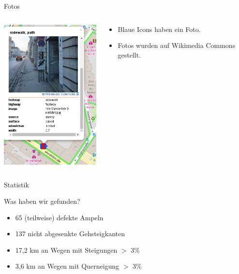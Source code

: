 \documentclass{beamer}
\begin{document}
\begin{frame}{Fotos}

  \begin{columns}[c]
    \begin{column}[T]{.6\textwidth}

      \begin{center}
      \vspace{-1cm}
      \includegraphics[width=5.5cm]{Fotos-screenie.png}
      \end{center}

    \end{column}
    \begin{column}[T]{.4\textwidth}

      \begin{itemize}
        \vspace{1cm}
        \item Blaue Icons haben ein Foto.
        \vspace{1cm}
        \item Fotos wurden auf Wikimedia Commons gestellt.
        \end{itemize}

    \end{column}
  \end{columns}

\end{frame}

\begin{frame}{Statistik}

  Was haben wir gefunden?

      \begin{itemize}
        \item 65 (teilweise) defekte Ampeln
        \item 137 nicht abgesenkte Gehsteigkanten
        \item 17,2 km an Wegen mit Steigungen $>$ 3\%
        \item 3,6 km an Wegen mit Querneigung $>$ 3\%
      \end{itemize}
        
\end{frame}
\end{document}
